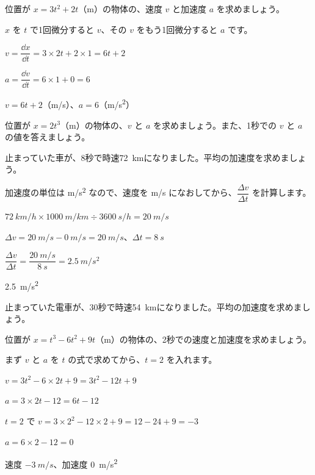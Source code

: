 
\begin{reidai}[速度と加速度を求める]
位置が $x=3t^2+2t$（m）の物体の、速度 $v$ と加速度 $a$ を求めましょう。\par
\kangaekata $x$ を $t$ で1回微分すると $v$、その $v$ をもう1回微分すると $a$ です。\par
\shiki $v=\dfrac{\dd x}{\dd t}=3\times2t+2\times1=6t+2$\par
\hspace*{2.6\zw}$a=\dfrac{\dd v}{\dd t}=6\times1+0=6$\par
\kotae $v=6t+2$（m/s）、$a=6$（\unit{m/s^2}）
\end{reidai}

\begin{jibun}
位置が $x=2t^3$（m）の物体の、$v$ と $a$ を求めましょう。また、1秒での $v$ と $a$ の値を答えましょう。
\end{jibun}

\begin{reidai}[平均の加速度]
止まっていた車が、8秒で時速\qty{72}{km}になりました。平均の加速度を求めましょう。\par
\kangaekata 加速度の単位は \unit{m/s^2} なので、速度を m/s になおしてから、$\dfrac{\Delta v}{\Delta t}$ を計算します。\par
\shiki $\qty{72}{km/h}\times\qty{1000}{m/km}\div\qty{3600}{s/h}=\qty{20}{m/s}$\par
\hspace*{2.6\zw}$\Delta v=\qty{20}{m/s}-\qty{0}{m/s}=\qty{20}{m/s}$、$\Delta t=\qty{8}{s}$\par
\hspace*{2.6\zw}$\dfrac{\Delta v}{\Delta t}=\dfrac{\qty{20}{m/s}}{\qty{8}{s}}=\qty{2.5}{m/s^2}$\par
\kotae \qty{2.5}{m/s^2}
\end{reidai}

\begin{jibun}
止まっていた電車が、30秒で時速\qty{54}{km}になりました。平均の加速度を求めましょう。
\end{jibun}

\begin{reidai}[ある時刻の値]
位置が $x=t^3-6t^2+9t$（m）の物体の、2秒での速度と加速度を求めましょう。\par
\kangaekata まず $v$ と $a$ を $t$ の式で求めてから、$t=2$ を入れます。\par
\shiki $v=3t^2-6\times2t+9=3t^2-12t+9$\par
\hspace*{2.6\zw}$a=3\times2t-12=6t-12$\par
\hspace*{2.6\zw}$t=2$ で $v=3\times2^2-12\times2+9=12-24+9=-3$\par
\hspace*{2.6\zw}$a=6\times2-12=0$\par
\kotae 速度 $\qty{-3}{m/s}$、加速度 \qty{0}{m/s^2}
\end{reidai}

